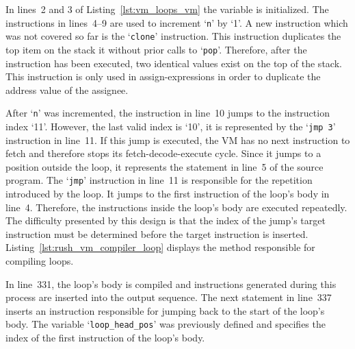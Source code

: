\noindent
\begin{minipage}{.44\textwidth}
    \centering
\end{minipage}%
\hfill
\begin{minipage}{.44\textwidth}
    \centering
    \vspace{.1cm}
\end{minipage}

In lines~2 and 3 of Listing~\ref{lst:vm_loops_vm} the variable  is initialized.
The instructions in lines~4--9 are used to increment `\texttt{n}' by `1'.
A new instruction which was not covered so far is the `\texttt{clone}' instruction.
This instruction duplicates the top item on the stack it without prior calls to `\texttt{pop}'.
Therefore, after the instruction has been executed, two identical values exist on the top of the stack.
This instruction is only used in assign-expressions in order to duplicate the address value of the assignee.

After `\texttt{n}' was incremented, the instruction in line~10 jumps to the instruction index `11'.
However, the last valid index is `10', it is represented by the `\texttt{jmp 3}' instruction in line~11.
If this jump is executed, the VM has no next instruction to fetch and therefore stops its fetch-decode-execute cycle.
Since it jumps to a position outside the loop, it represents the  statement in line~5 of the source program.
The `\texttt{jmp}' instruction in line~11 is responsible for the repetition introduced by the loop.
It jumps to the first instruction of the loop's body in line~4.
Therefore, the instructions inside the loop's body are executed repeatedly.
The difficulty presented by this design is that the index of the jump's target instruction must be determined before the target instruction is inserted.
Listing~\ref{lst:rush_vm_compiler_loop} displays the method responsible for compiling loops.


In line~331, the loop's body is compiled and instructions generated during this process are inserted into the output sequence.
The next statement in line~337 inserts an instruction responsible for jumping back to the start of the loop's body.
The variable `\texttt{loop\_head\_pos}' was previously defined and specifies the index of the first instruction of the loop's body.

